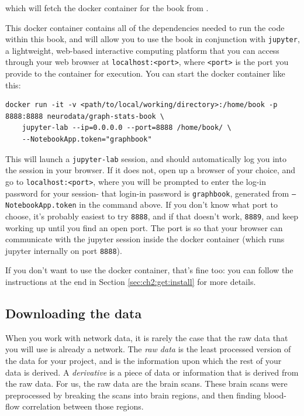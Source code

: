 which will fetch the docker container for the book from \cite{thisbookdocker}.

This docker container contains all of the dependencies needed to run the code within this book, and will allow you to use the book in conjunction with \texttt{jupyter}, a lightweight, web-based interactive computing platform that you can access through your web browser at \texttt{localhost:<port>}, where \texttt{<port>} is the port you provide to the container for execution. You can start the docker container like this:


\begin{lstlisting}[style=bash]
docker run -it -v <path/to/local/working/directory>:/home/book -p 8888:8888 neurodata/graph-stats-book \
    jupyter-lab --ip=0.0.0.0 --port=8888 /home/book/ \
    --NotebookApp.token="graphbook"
\end{lstlisting}

This will launch a \texttt{jupyter-lab} session, and {should} automatically log you into the session in your browser. If it does not, open up a browser of your choice, and go to \texttt{localhost:<port>}, where you will be prompted to enter the log-in password for your session- that login-in password is \texttt{graphbook}, generated from \texttt{--NotebookApp.token} in the command above. If you don't know what port to choose, it's probably easiest to try \texttt{8888}, and if that doesn't work, \texttt{8889}, and keep working up until you find an open port. The port is so that your browser can communicate with the jupyter session inside the docker container (which runs jupyter internally on port \texttt{8888}).

If you don't want to use the docker container, that's fine too: you can follow the instructions at the end in Section \ref{sec:ch2:get:install} for more details. 

\subsection{Downloading the data}

When you work with network data, it is rarely the case that the {raw data} that you will use is already a network. The \textit{raw data} is the least processed version of the data for your project, and is the information upon which the rest of your data is {derived}. A \textit{derivative} is a piece of data or information that is {derived} from the raw data. For us, the raw data are the brain scans. These brain scans were preprocessed by breaking the scans into brain regions, and then finding blood-flow correlation between those regions.

